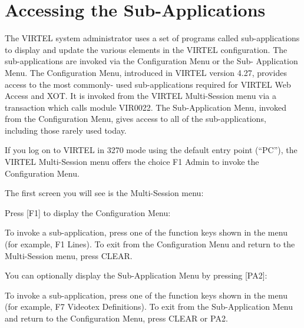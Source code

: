 \documentclass[letterpaper,10pt,english]{sphinxmanual}
\begin{document}
\section{Accessing the Sub-Applications}
\label{\detokenize{connectivity_guide:accessing-the-sub-applications}}
The VIRTEL system administrator uses a set of programs called sub-applications to display and update the various elements in the VIRTEL configuration. The sub-applications are invoked via the Configuration Menu or the Sub- Application Menu. The Configuration Menu, introduced in VIRTEL version 4.27, provides access to the most commonly- used sub-applications required for VIRTEL Web Access and XOT. It is invoked from the VIRTEL Multi-Session menu via a transaction which calls module VIR0022. The Sub-Application Menu,
invoked from the Configuration Menu, gives access to all of the sub-applications, including those rarely used today.

If you log on to VIRTEL in 3270 mode using the default entry point (“PC”), the VIRTEL Multi-Session menu offers the choice F1 \textendash{} Admin to invoke the Configuration Menu.

The first screen you will see is the Multi-Session menu:



Press {[}F1{]} to display the Configuration Menu:



To invoke a sub-application, press one of the function keys shown in the menu (for example, F1 \textendash{} Lines). To exit from the Configuration Menu and return to the Multi-Session menu, press CLEAR.

You can optionally display the Sub-Application Menu by pressing
{[}PA2{]}:



To invoke a sub-application, press one of the function keys shown in the menu (for example, F7 \textendash{} Videotex Definitions). To exit from the Sub-Application Menu and return to the Configuration Menu, press CLEAR or PA2.
\end{document}
